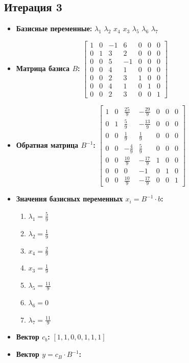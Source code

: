 \begin{itemize}
\subsection*{Итерация 3}
\begin{itemize}
\item \textbf{Базисные переменные:}
$\lambda_1$
$\lambda_2$
$x_4$
$x_3$
$\lambda_5$
$\lambda_6$
$\lambda_7$
\item \textbf{Матрица базиса $B$:}
$\left[\begin{matrix}1 & 0 & -1 & 6 & 0 & 0 & 0\\0 & 1 & 3 & 2 & 0 & 0 & 0\\0 & 0 & 5 & -1 & 0 & 0 & 0\\0 & 0 & 4 & 1 & 0 & 0 & 0\\0 & 0 & 2 & 3 & 1 & 0 & 0\\0 & 0 & 4 & 1 & 0 & 1 & 0\\0 & 0 & 2 & 3 & 0 & 0 & 1\end{matrix}\right]$
\item \textbf{Обратная матрица $B^{-1}$:}
$\left[\begin{matrix}1 & 0 & \frac{25}{9} & - \frac{29}{9} & 0 & 0 & 0\\0 & 1 & \frac{5}{9} & - \frac{13}{9} & 0 & 0 & 0\\0 & 0 & \frac{1}{9} & \frac{1}{9} & 0 & 0 & 0\\0 & 0 & - \frac{4}{9} & \frac{5}{9} & 0 & 0 & 0\\0 & 0 & \frac{10}{9} & - \frac{17}{9} & 1 & 0 & 0\\0 & 0 & 0 & -1 & 0 & 1 & 0\\0 & 0 & \frac{10}{9} & - \frac{17}{9} & 0 & 0 & 1\end{matrix}\right]$
\item \textbf{Значения базисных переменных $ x_i = B^{-1} \cdot b$:}
\begin{enumerate}
\item $\lambda_1 = \frac{5}{9}$
\item $\lambda_2 = \frac{1}{9}$
\item $x_4 = \frac{2}{9}$
\item $x_3 = \frac{1}{9}$
\item $\lambda_5 = \frac{11}{9}$
\item $\lambda_6 = 0$
\item $\lambda_7 = \frac{11}{9}$
\end{enumerate}
\item \textbf{Вектор $c_b$:}
$[1, 1, 0, 0, 1, 1, 1]$
\item \textbf{Вектор $y = c_B \cdot B^{-1}$:}

\end{itemize}
\end{itemize}
